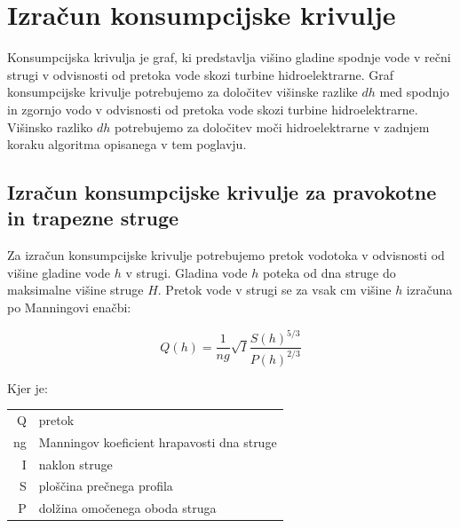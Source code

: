 \section{Izračun konsumpcijske krivulje}
Konsumpcijska krivulja je graf, ki predstavlja višino gladine spodnje vode v rečni strugi v odvisnosti od pretoka vode skozi turbine hidroelektrarne. Graf konsumpcijske krivulje potrebujemo za določitev višinske razlike $dh$ med spodnjo in zgornjo vodo v odvisnosti od pretoka vode skozi turbine hidroelektrarne. Višinsko razliko $dh$ potrebujemo za določitev moči hidroelektrarne v zadnjem koraku algoritma opisanega v tem poglavju.



\subsection{Izračun konsumpcijske krivulje za pravokotne in trapezne struge}
Za izračun konsumpcijske krivulje potrebujemo pretok vodotoka v odvisnosti od višine gladine vode $h$ v strugi. Gladina vode $h$ poteka od dna struge do maksimalne višine struge $H$. Pretok vode v strugi se za vsak cm višine $h$ izračuna po Manningovi enačbi:

\begin{equation}
Q(h) = \dfrac{1}{ng} \sqrt{I}\dfrac{S(h)^{5/3}}{P(h)^{2/3}} \label{eq:ManningovaEnacba}
\end{equation}

Kjer je:

\begin{table}[htb!]
	\begin{tabular}{r|p{10cm}}
		Q & pretok \\
		ng & Manningov koeficient hrapavosti dna struge\\
		I & naklon struge \\
		S & ploščina prečnega profila \\
		P & dolžina omočenega oboda struga
	\end{tabular}
\end{table}



